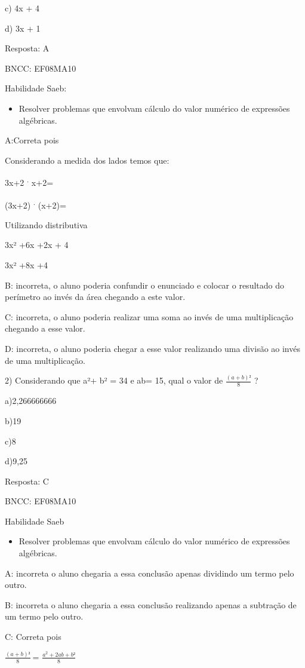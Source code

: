 c) 4x + 4

d) 3x + 1

Resposta: A

BNCC: EF08MA10

Habilidade Saeb:

\begin{itemize}
\tightlist
\item
  Resolver problemas que envolvam cálculo do valor numérico de
  expressões algébricas.
\end{itemize}

A:Correta pois

Considerando a medida dos lados temos que:

3x+2 \textsuperscript{.} x+2=

(3x+2) \textsuperscript{.} (x+2)=

Utilizando distributiva

3x² +6x +2x + 4

3x² +8x +4

B: incorreta, o aluno poderia confundir o enunciado e colocar o
resultado do perímetro ao invés da área chegando a este valor.

C: incorreta, o aluno poderia realizar uma soma ao invés de uma
multiplicação chegando a esse valor.

D: incorreta, o aluno poderia chegar a esse valor realizando uma divisão
ao invés de uma multiplicação.

2) Considerando que a²+ b² = 34 e ab= 15, qual o valor de
\(\frac{(a + b)²}{8}\) ?

a)2,266666666

b)19

c)8

d)9,25

Resposta: C

BNCC: EF08MA10

Habilidade Saeb

\begin{itemize}
\tightlist
\item
  Resolver problemas que envolvam cálculo do valor numérico de
  expressões algébricas.
\end{itemize}

A: incorreta o aluno chegaria a essa conclusão apenas dividindo um termo
pelo outro.

B: incorreta o aluno chegaria a essa conclusão realizando apenas a
subtração de um termo pelo outro.

C: Correta pois

\(\frac{(a + b)²}{8}\ \)= \(\frac{a^{2} + 2ab + b²}{8}\)

